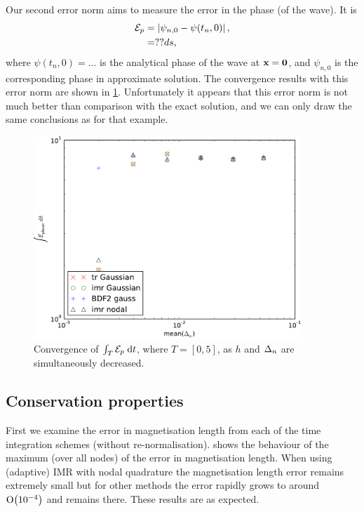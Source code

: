 Our second error norm aims to measure the error in the phase (of the wave).
It is
\begin{equation}
  \begin{aligned}
    \mathcal{E}_p &= \left|{\psi_{n,0} - \psi(t_n, 0)} \right|, \\
    &= ??ds,
  \end{aligned}
\end{equation}
where $\psi(t_n, 0) = ...$ is the analytical phase of the wave at $\boldsymbol{\mathrm{x}} = \mathbf{0}$, and $\psi_{n,0}$ is the corresponding phase in approximate solution.
The convergence results with this error norm are shown in \cref{fig:convergence-long-time-phase-norm}.
Unfortunately it appears that this error norm is not much better than comparison with the exact solution, and we can only draw the same conclusions as for that example.
\begin{figure}
  \centering
  \includegraphics[width=0.9\textwidth]{plots/2d_wave_solution_convergence_long_time/auxerr0integralvsmeanofdts.pdf}
  \caption{Convergence of ${\int_T {\mathcal{E}_p} {\; \mathrm{{d}}} t}$, where $T=[0,5]$, as $h$ and $\Delta_{n}$ are simultaneously decreased.}
  \label{fig:convergence-long-time-phase-norm}
\end{figure}



\subsection{Conservation properties}
\label{sec:2d-wave-results-cons-prop}

First we examine the error in magnetisation length from each of the time integration schemes (without re-normalisation).
 shows the behaviour of the maximum (over all nodes) of the error in magnetisation length.
When using (adaptive) IMR with nodal quadrature the magnetisation length error remains extremely small but for other methods the error rapidly grows to around $\mathrm{O}{\left( 10^{-4} \right)}$ and remains there.
These results are as expected.


